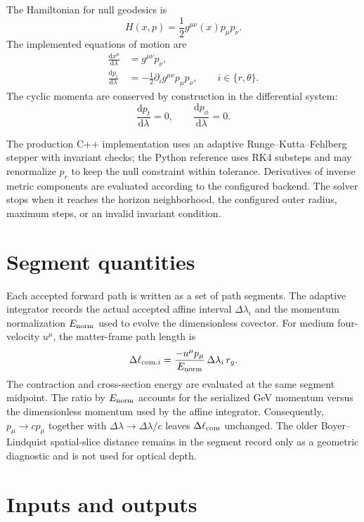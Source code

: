 \documentclass[11pt,a4paper]{report}
\numberwithin{equation}{chapter}
\newcommand{\dd}{\mathrm{d}}
\begin{document}
The Hamiltonian for null geodesics is
\begin{equation}
H(x,p)=\frac{1}{2}g^{\mu\nu}(x)p_\mu p_\nu.
\end{equation}
The implemented equations of motion are
\begin{align}
\frac{\dd x^\mu}{\dd\lambda} &=
g^{\mu\nu}p_\nu,\\
\frac{\dd p_i}{\dd\lambda} &=
-\frac{1}{2}
\partial_i g^{\mu\nu}p_\mu p_\nu,
\qquad i\in\{r,\theta\}.
\end{align}
The cyclic momenta are conserved by construction in the differential system:
\begin{equation}
\frac{\dd p_t}{\dd\lambda}=0,\qquad
\frac{\dd p_\phi}{\dd\lambda}=0.
\end{equation}

The production C++ implementation uses an adaptive Runge--Kutta--Fehlberg
stepper with invariant checks; the Python reference uses RK4 substeps and may
renormalize $p_r$ to keep the null constraint within tolerance. Derivatives of
inverse metric components are evaluated according to the configured backend.
The solver stops when it reaches the horizon neighborhood, the configured outer
radius, maximum steps, or an invalid invariant condition.

\section{Segment quantities}

Each accepted forward path is written as a set of path segments. The adaptive
integrator records the actual accepted affine interval $\Delta\lambda_i$ and
the momentum normalization $E_{\rm norm}$ used to evolve the dimensionless
covector. For medium four-velocity $u^\mu$, the matter-frame path length is
\begin{equation}
\Delta \ell_{{\rm com},i}
=
\frac{-u^\mu p_\mu}{E_{\rm norm}}\,\Delta\lambda_i\,r_g.
\end{equation}
The contraction and cross-section energy are evaluated at the same segment
midpoint. The ratio by $E_{\rm norm}$ accounts for the serialized GeV momentum
versus the dimensionless momentum used by the affine integrator. Consequently,
$p_\mu\rightarrow c p_\mu$ together with
$\Delta\lambda\rightarrow\Delta\lambda/c$ leaves
$\Delta\ell_{\rm com}$ unchanged. The older Boyer--Lindquist spatial-slice
distance remains in the segment record only as a geometric diagnostic and is
not used for optical depth.

\section{Inputs and outputs}
\end{document}
